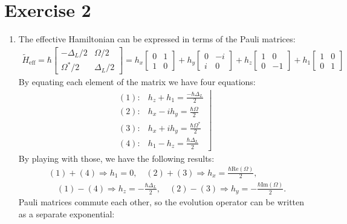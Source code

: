 \documentclass[letterpaper,11pt,twoside]{article}
\newcommand{\re}[1]{\text{Re}\left(#1\right)}
\newcommand{\im}[1]{\text{Im}\left(#1\right)}
\begin{document}
\section*{Exercise 2}
\begin{enumerate}[itemsep=0pt,topsep=0pt,parsep=0pt,label=\alph*)]
  \item The effective Hamiltonian can be expressed in terms of the Pauli matrices:
  \begin{align*}
    \tilde{H}_{\mathrm{eff}}=\hbar\begin{bmatrix}
      -\Delta_L/2&\Omega/2\\\Omega^*/2&\Delta_L/2
    \end{bmatrix}=h_x\begin{bmatrix}
      0&1\\1&0
    \end{bmatrix}+h_y\begin{bmatrix}
      0&-i\\i&0
    \end{bmatrix}+h_z\begin{bmatrix}
      1&0\\0&-1
    \end{bmatrix}+h_1\begin{bmatrix}
      1&0\\0&1
    \end{bmatrix}
  \end{align*}
  By equating each element of the matrix we have four equations:
  \begin{align*}
    \left.\begin{array}{rl}
      (1):&h_z+h_1=\frac{-\hbar\Delta_L}{2}\\
      (2):&h_x-ih_y=\frac{\hbar\Omega}{2}\\
      (3):&h_x+ih_y=\frac{\hbar\Omega^*}{2}\\
      (4):&h_1-h_z=\frac{\hbar\Delta_L}{2}
    \end{array}\right\rfloor
  \end{align*}
  By playing with those, we have the following results:
  \begin{align*}
    &(1)+(4)\Longrightarrow h_1=0,\quad (2)+(3)\Longrightarrow h_x=\frac{\hbar\re{\Omega}}{2},\\
    &\quad (1)-(4)\Longrightarrow h_z=-\frac{\hbar\Delta_L}{2},\quad(2)-(3)\Longrightarrow h_y=-\frac{\hbar\im{\Omega}}{2}.
  \end{align*}
  Pauli matrices commute each other, so the evolution operator can be written as a separate exponential:
  \begin{align*}

\end{align*}
\end{enumerate}
\end{document}
